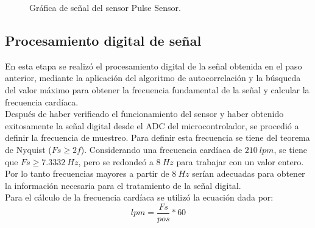 	\begin{figure}[htbp!]
		\centering
		\caption{Gráfica de señal del sensor Pulse Sensor.}
		\label{fig:GraficaPulseSensor}
	\end{figure}
	
\subsection{Procesamiento digital de señal}
En esta etapa se realizó el procesamiento digital de la señal obtenida en el paso anterior, mediante la aplicación del algoritmo de autocorrelación y la búsqueda del valor máximo para obtener la frecuencia fundamental de la señal y calcular la frecuencia cardíaca.\\

Después de haber verificado el funcionamiento del sensor y haber obtenido exitosamente la señal digital desde el ADC del microcontrolador, se procedió a definir la frecuencia de muestreo. Para definir esta frecuencia se tiene del teorema de Nyquist ($Fs \geq 2f$). Considerando una frecuencia cardíaca de $210\ lpm$, se tiene que $Fs \geq 7.3332\ Hz$, pero se redondeó a $8\ Hz$ para trabajar con un valor entero. Por lo tanto frecuencias mayores a partir de $8\ Hz$ serían adecuadas para obtener la información necesaria para el tratamiento de la señal digital.\\

Para el cálculo de la frecuencia cardíaca se utilizó la ecuación dada por:
\begin{equation}
\label{eq:lpm}
lpm = \frac{Fs}{pos} * 60
\end{equation}

